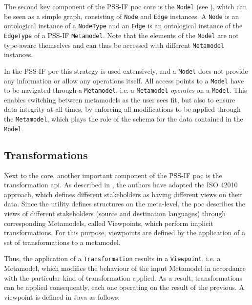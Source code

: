 The second key component of the PSS-IF \gls{poc} core is the \texttt{Model} (see ), which can be seen as a simple graph, consisting of \texttt{Node} and \texttt{Edge} instances. A \texttt{Node} is an ontological instance of a \texttt{NodeType} and an \texttt{Edge} is an ontological instance of the \texttt{EdgeType} of a PSS-IF \texttt{Metamodel}. Note that the elements of the \texttt{Model} are not type-aware themselves and can thus be accessed with different \texttt{Metamodel} instances.

In the PSS-IF \gls{poc} this strategy is used extensively, and a \texttt{Model} does not provide any information or allow any operations itself. All access points to a \texttt{Model} have to be navigated through a \texttt{Metamodel}, i.e. a \texttt{Metamodel} \textit{operates} on a \texttt{Model}. This enables switching between metamodels as the user sees fit, but also to ensure data integrity at all times, by enforcing all modifications to be applied through the \texttt{Metamodel}, which plays the role of the schema for the data contained in the \texttt{Model}.

\subsection{Transformations}

Next to the core, another important component of the PSS-IF \gls{poc} is the transformation \gls{api}. As described in , the authors have adopted the ISO 42010 approach, which defines different stakeholders as having different views on their data. Since the utility defines structures on the meta-level, the \gls{poc} describes the views of different stakeholders (source and destination languages) through corresponding Metamodels, called Viewpoints, which perform implicit transformations. For this purpose, viewpoints are defined by the application of a set of transformations to a metamodel.

Thus, the application of a \texttt{Transformation} results in a \texttt{Viewpoint}, i.e. a Metamodel, which modifies the behaviour of the input Metamodel in accordance with the particular kind of transformation applied. As a result, transformations can be applied consequently, each one operating on the result of the previous. A viewpoint is defined in Java as follows:

